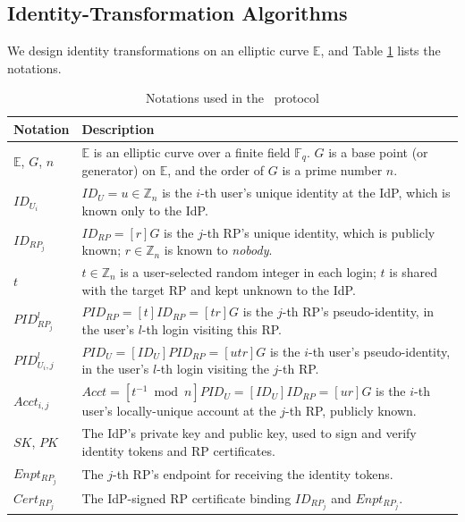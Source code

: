 \subsection{Identity-Transformation Algorithms}
\label{subsec:overview}

We design identity transformations on an elliptic curve $\mathbb{E}$,
and Table \ref{tbl:notations-protocol} lists the notations.


\begin{table}[tb]
\footnotesize
    \caption{Notations used in the \usso\ protocol}
    \centering
    \begin{tabular}{|p{0.93cm}|p{6.71cm}|} \hline
    {\textbf{Notation}} & {\textbf{Description}} \\ \hline
    {$\mathbb{E}$, $G$, $n$} & {$\mathbb{E}$ is an elliptic curve over a finite field $\mathbb{F}_q$. $G$ is a base point (or generator) on $\mathbb{E}$, and the order of $G$ is a prime number $n$.} \\ \hline
    {$ID_{U_i}$} & {$ID_U = u \in \mathbb{Z}_n$ is the $i$-th user's unique identity at the IdP, which is known only to the IdP.} \\ \hline
   {$ID_{RP_j}$} & {$ID_{RP} = [r]G$ is the $j$-th RP's unique identity, which is publicly known; $r \in \mathbb{Z}_n$ is known to \emph{nobody}.} \\ \hline
    {$t$} & {$t \in \mathbb{Z}_n$ is a user-selected random integer in each login; $t$ is shared with the target RP and kept unknown to the IdP.} \\ \hline
    {$PID_{RP_j}^l$} & {$PID_{RP} = [t]{ID_{RP}} = [tr]G$ is the $j$-th RP's pseudo-identity, in the user's $l$-th login visiting this RP.} \\ \hline
    {$PID_{U_i,j}^l$} & {$PID_U = [{ID_U}]{PID_{RP}} = [utr]G$ is the $i$-th user's pseudo-identity, in the user's $l$-th login visiting the $j$-th RP.} \\ \hline
     {$Acct_{i,j}$} & {$Acct = [t^{-1}\bmod n]PID_{U} = [ID_U]ID_{RP} = [ur]G$ is the $i$-th user's locally-unique account at the $j$-th RP, publicly known.} \\ \hline
    {$SK$, $PK$} & {The IdP's private key and public key, used to sign and verify identity tokens and RP certificates.} \\ \hline
    {$Enpt_{RP_j}$} & {The $j$-th RP's endpoint for receiving the identity tokens.} \\ \hline
    {$Cert_{RP_j}$} & {The IdP-signed RP certificate binding $ID_{RP_j}$ and $Enpt_{RP_j}$.} \\ \hline
    \end{tabular}
    \label{tbl:notations-protocol}
\end{table}

